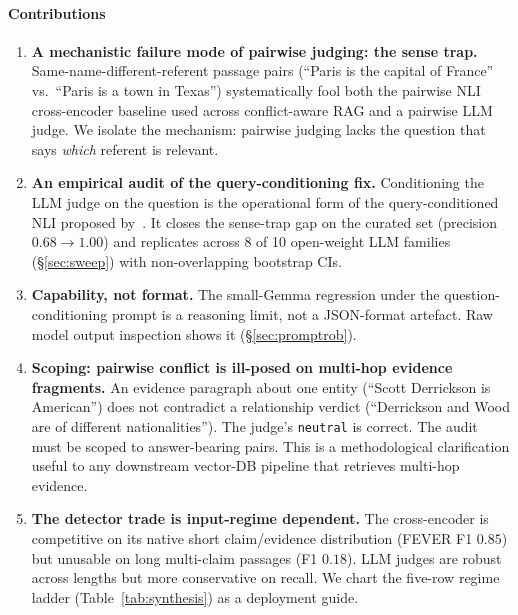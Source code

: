 \documentclass[sigconf, nonacm, natbib]{acmart}
\begin{document}
\paragraph{Contributions}
\begin{enumerate}
  \item \textbf{A mechanistic failure mode of pairwise judging: the sense trap.}
  Same-name-different-referent passage pairs (``Paris is the capital of France'' vs.\
  ``Paris is a town in Texas'') systematically fool both the pairwise NLI cross-encoder
  baseline used across conflict-aware RAG
  \citep{conflictrag2025,madamrag2025,contradetect2025} and a pairwise LLM judge.
  We isolate the mechanism: pairwise judging lacks the question that says
  \emph{which} referent is relevant.
  \item \textbf{An empirical audit of the query-conditioning fix.}
  Conditioning the LLM judge on the question is the operational form of the
  query-conditioned NLI proposed by~\citet{canby2025qnli}. It closes the sense-trap gap
  on the curated set (precision $0.68 \to 1.00$) and replicates across 8 of 10
  open-weight LLM families (\S\ref{sec:sweep}) with non-overlapping bootstrap CIs.
  \item \textbf{Capability, not format.} The small-Gemma regression under the
  question-conditioning prompt is a reasoning limit, not a JSON-format artefact.
  Raw model output inspection shows it (\S\ref{sec:promptrob}).
  \item \textbf{Scoping: pairwise conflict is ill-posed on multi-hop evidence
  fragments.} An evidence paragraph about one entity (``Scott Derrickson is American'')
  does not contradict a relationship verdict (``Derrickson and Wood are of different
  nationalities''). The judge's \texttt{neutral} is correct. The audit must be scoped
  to answer-bearing pairs. This is a methodological clarification useful to any
  downstream vector-DB pipeline that retrieves multi-hop evidence.
  \item \textbf{The detector trade is input-regime dependent.} The cross-encoder is
  competitive on its native short claim/evidence distribution (FEVER F1 $0.85$) but
  unusable on long multi-claim passages (F1 $0.18$). LLM judges are robust across
  lengths but more conservative on recall. We chart the five-row regime
  ladder (Table~\ref{tab:synthesis}) as a deployment guide.
\end{enumerate}
\end{document}
